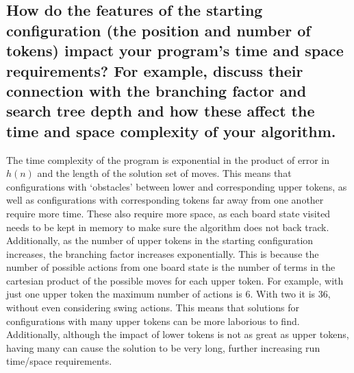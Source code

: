 \documentclass{article}
\begin{document}
\subsection*{How do the features of the starting configuration (the position and number of tokens) impact your program’s time and space requirements? For example, discuss their connection with the branching factor and search tree depth and how these affect the time and space complexity of your algorithm.}
The time complexity of the program is exponential in the product of error in $h(n)$ and the length of the solution set of moves. This means that configurations with ‘obstacles’ between lower and corresponding upper tokens, as well as configurations with corresponding tokens far away from one another require more time. These also require more space, as each board state visited needs to be kept in memory to make sure the algorithm does not back track. Additionally, as the number of upper tokens in the starting configuration increases, the branching factor increases exponentially. This is because the number of possible actions from one board state is the number of terms in the cartesian product of the possible moves for each upper token. For example, with just one upper token the maximum number of actions is 6. With two it is 36, without even considering swing actions. This means that solutions for configurations with many upper tokens can be more laborious to find. Additionally, although the impact of lower tokens is not as great as upper tokens, having many can cause the solution to be very long, further increasing run time/space requirements.
\end{document}
